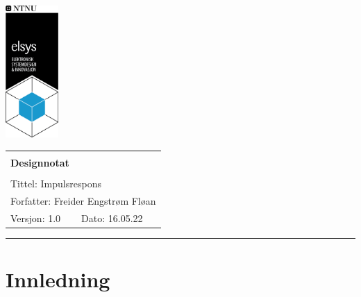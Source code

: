 \documentclass[a4paper,11pt,norsk]{article}
\begin{document}
\begin{minipage}[c]{0.15\textwidth}
\includegraphics[width=2.0cm]{D1/Images/elsys_pos_staaende_ntnu.png}  
\end{minipage}
\begin{minipage}[c]{0.85\textwidth}

\renewcommand{\arraystretch}{1.7}
\large 
\begin{tabularx}{\textwidth}{|X|X|}
\hline
\multicolumn{2}{|l|}{} \\
\multicolumn{2}{|l|}{\huge \textbf{Designnotat}} \\
\multicolumn{2}{|l|}{}  \\
\hline
\multicolumn{2}{|l|}{Tittel: 
Impulsrespons
} \\
\hline
\multicolumn{2}{|l|}{Forfatter: 
Freider Engstrøm Fløan
} \\
\hline
Versjon: 1.0 & Dato: 16.05.22
\\
\hline 
\end{tabularx}
\end{minipage}
\normalsize


\setlength{\parskip}{0ex}
\renewcommand{\baselinestretch}{0.1}\normalsize
\tableofcontents
\renewcommand{\baselinestretch}{1.00}\normalsize
\setlength{\parskip}{2ex}
\rule{\textwidth}{1pt}
\label{sec:innledning}

\newpage



\section{Innledning}
\label{sec:problembeskrivelse}
\end{document}
